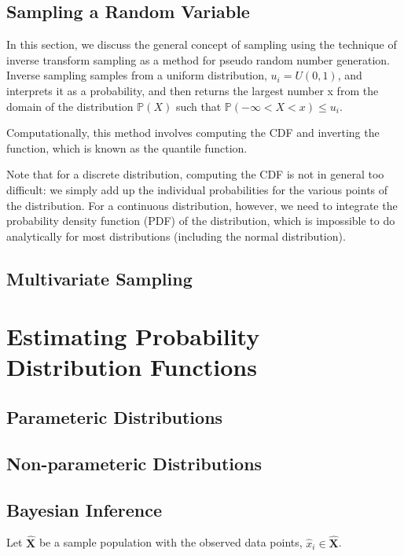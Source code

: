 \subsection{Sampling a Random Variable}

In this section, we discuss the general concept of sampling using the technique of inverse transform sampling as a method for pseudo random number generation.  Inverse sampling samples from a uniform distribution, $u_i=U(0,1)$, and interprets it as a probability, and then returns the largest number x from the domain of the distribution $\mathbb{P}(X)$ such that $\mathbb{P}(-\infty<X<x) \leq u_i$.

Computationally, this method involves computing the CDF and inverting the function, which is known as the quantile function.

Note that for a discrete distribution, computing the CDF is not in general too difficult: we simply add up the individual probabilities for the various points of the distribution.  For a continuous distribution, however, we need to integrate the probability density function (PDF) of the distribution, which is impossible to do analytically for most distributions (including the normal distribution).

\subsection{Multivariate Sampling}
\label{section:multivariate_sampling}

\section{Estimating Probability Distribution Functions}

\subsection{Parameteric Distributions}

\subsection{Non-parameteric Distributions}


\subsection{Bayesian Inference}
\label{section:bayes}

Let $\hat{\bm{X}}$ be a sample population with the observed data points, $\hat{x}_i \in \hat{\bm{X}}$.

